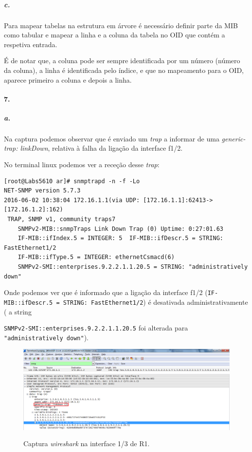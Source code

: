 \subparagraph{c.}
Para mapear tabelas na estrutura em árvore é necessário definir parte da MIB como tabular e mapear a linha e a coluna da tabela no OID que contém a respetiva entrada.

É de notar que, a coluna pode ser sempre identificada por um número (número da coluna), a linha é identificada pelo índice, e que no mapeamento para o OID, aparece primeiro a coluna e depois  a linha.


\paragraph{7.}

\subparagraph{a.}
Na captura podemos observar que é enviado um \emph{trap} a informar de uma \emph{generic-trap: linkDown}, relativa à falha da ligação da interface \textsf{f1/2}.

No terminal \textsf{linux} podemos ver a receção desse \emph{trap}:
\begin{verbatim}
[root@Labs5610 ar]# snmptrapd -n -f -Lo
NET-SNMP version 5.7.3
2016-06-02 10:38:04 172.16.1.1(via UDP: [172.16.1.1]:62413->[172.16.1.2]:162)
 TRAP, SNMP v1, community traps7
	SNMPv2-MIB::snmpTraps Link Down Trap (0) Uptime: 0:27:01.63
	IF-MIB::ifIndex.5 = INTEGER: 5	IF-MIB::ifDescr.5 = STRING: FastEthernet1/2
	IF-MIB::ifType.5 = INTEGER: ethernetCsmacd(6)	
	SNMPv2-SMI::enterprises.9.2.2.1.1.20.5 = STRING: "administratively down"
\end{verbatim}

Onde podemos ver que é informado que a ligação da interface \textsf{f1/2} (\texttt{IF-MIB::ifDescr.5 = STRING: FastEthernet1/2}) é desativada administrativamente ( a string

\texttt{SNMPv2-SMI::enterprises.9.2.2.1.1.20.5} foi alterada para \texttt{"administratively down"}).

\begin{figure}[h]
\centering
\includegraphics[width=1\textwidth, height=0.3\textheight]{7a.png}
\label{fig:10-capturaWireshark}
\caption{Captura \emph{wireshark} na interface \textsf{1/3} de \textsf{R1}.}
\end{figure}

